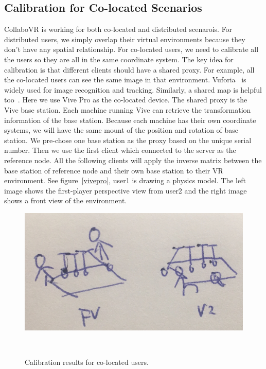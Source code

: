 \documentclass{sigchi}
\begin{document}
\subsection{Calibration for Co-located Scenarios}
CollaboVR is working for both co-located and distributed scenarois. For distributed users, we simply overlap their virtual environments because they don't have any spatial relationship. For co-located users, we need to calibrate all the users so they are all in the same coordinate system. The key idea for calibration is that different clients should have a shared proxy. For example, all the co-located users can see the same image in that environment. Vuforia~\cite{Vuforia} is widely used for image recognition and tracking. Similarly, a shared map is helpful too~\cite{Hololens}. Here we use Vive Pro as the co-located device. The shared proxy is the Vive base station. Each machine running Vive can retrieve the transformation information of the base station. Because each machine has their own coordinate systems, we will have the same mount of the position and rotation of base station. We pre-chose one base station as the proxy based on the unique serial number. Then we use the first client which connected to the server as the reference node. All the following clients will apply the inverse matrix between the base station of reference node and their own base station to their VR environment. See figure~\ref{vivepro}, user1 is drawing a physics model. The left image shows the first-player perspective view from user2 and the right image shows a front view of the environment.

\begin{figure}[tb!]
 \centering
 \includegraphics[width=0.9\columnwidth]{vivepro.jpg}
 \caption{Calibration results for co-located users.
 }~\label{fig:vivepro}
\end{figure}
\end{document}
